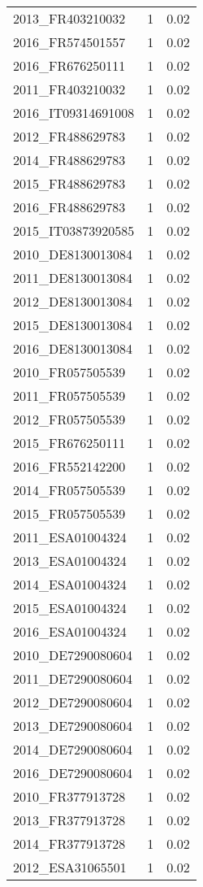 \begin{table*}[htbp]
\begin{tabular}{lrr}
2013_FR403210032 & 1 & 0.02 \\
2016_FR574501557 & 1 & 0.02 \\
2016_FR676250111 & 1 & 0.02 \\
2011_FR403210032 & 1 & 0.02 \\
2016_IT09314691008 & 1 & 0.02 \\
2012_FR488629783 & 1 & 0.02 \\
2014_FR488629783 & 1 & 0.02 \\
2015_FR488629783 & 1 & 0.02 \\
2016_FR488629783 & 1 & 0.02 \\
2015_IT03873920585 & 1 & 0.02 \\
2010_DE8130013084 & 1 & 0.02 \\
2011_DE8130013084 & 1 & 0.02 \\
2012_DE8130013084 & 1 & 0.02 \\
2015_DE8130013084 & 1 & 0.02 \\
2016_DE8130013084 & 1 & 0.02 \\
2010_FR057505539 & 1 & 0.02 \\
2011_FR057505539 & 1 & 0.02 \\
2012_FR057505539 & 1 & 0.02 \\
2015_FR676250111 & 1 & 0.02 \\
2016_FR552142200 & 1 & 0.02 \\
2014_FR057505539 & 1 & 0.02 \\
2015_FR057505539 & 1 & 0.02 \\
2011_ESA01004324 & 1 & 0.02 \\
2013_ESA01004324 & 1 & 0.02 \\
2014_ESA01004324 & 1 & 0.02 \\
2015_ESA01004324 & 1 & 0.02 \\
2016_ESA01004324 & 1 & 0.02 \\
2010_DE7290080604 & 1 & 0.02 \\
2011_DE7290080604 & 1 & 0.02 \\
2012_DE7290080604 & 1 & 0.02 \\
2013_DE7290080604 & 1 & 0.02 \\
2014_DE7290080604 & 1 & 0.02 \\
2016_DE7290080604 & 1 & 0.02 \\
2010_FR377913728 & 1 & 0.02 \\
2013_FR377913728 & 1 & 0.02 \\
2014_FR377913728 & 1 & 0.02 \\
2012_ESA31065501 & 1 & 0.02 \\

\end{tabular}
\end{table*}
